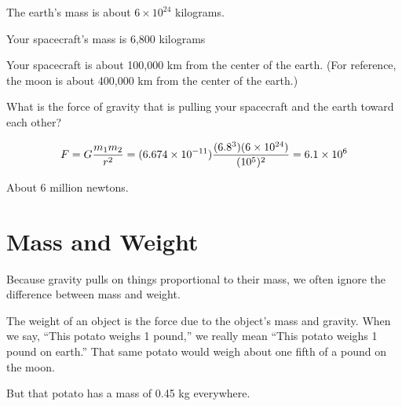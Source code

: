 \begin{Exercise}[title={Gravity}, label=gravity_earth]
  
  The earth's mass is about $6 \times 10^{24}$ kilograms.

  Your spacecraft's mass is 6,800 kilograms

  Your spacecraft is about 100,000 km from the center of the earth. (For reference, the moon is about 400,000 km from the center of the earth.)

  What is the force of gravity that is pulling your spacecraft and the earth toward each other?

\end{Exercise}
\begin{Answer}[ref=gravity_earth]

  $$F = G\frac{m_1 m_2}{r^2} = (6.674 \times 10^{-11})\frac{(6.8 \time 10^3)(6 \times 10^{24})}{(10^5)^2} = 6.1 \times 10^{6}$$

  About 6 million newtons.
  
\end{Answer}

\section{Mass and Weight}

Because gravity pulls on things proportional to their mass, we often
ignore the difference between mass and weight.

The weight of an object is the force due to the object's mass and
gravity.  When we say, ``This potato weighs 1 pound,'' we really mean
``This potato weighs 1 pound on earth.''  That same potato would weigh
about one fifth of a pound on the moon.

But that potato has a mass of 0.45 kg everywhere.
